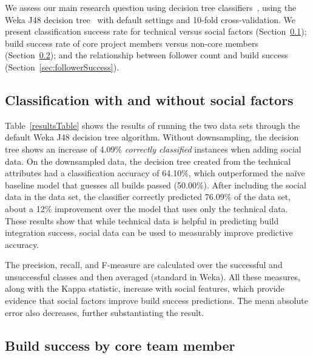 \documentclass[10pt, conference]{IEEEtran}
\begin{document}
We assess our main research question using decision tree
classifiers~\cite{Quinlan86}, using
%
the Weka J48 decision tree~\cite{Weka,Quinlan1993}
with default settings and 10-fold 
cross-validation.
We present classification
success rate for technical versus social factors
(Section~\ref{sec:successClassification}); 
build success rate of core project members versus non-core 
members (Section~\ref{sec:core}); and the relationship 
between follower count and build success (Section~\ref{sec:followerSuccess}).

\subsection{Classification with and without social factors}
\label{sec:successClassification}

Table~\ref{resultsTable} shows the results of running the two data sets through the
default Weka J48 decision tree algorithm.  Without downsampling, the 
decision tree shows an increase of 4.09\% \textit{correctly classified} instances when adding social data. On the downsampled data, the decision tree created from the technical attributes
had a classification accuracy of 64.10\%, which outperformed the na\"ive
baseline model that 
guesses all builds passed (50.00\%).
After including the social data
in the data set, the classifier correctly predicted 76.09\% of the data set,
about a 12\% improvement over the model that uses only the technical data.  These results show that
while technical data is helpful in predicting build integration success, social
data can be used to measurably improve predictive accuracy. 

The precision, recall, and
F-measure are calculated over the successful and unsuccessful classes and then
averaged (standard in Weka).  All these measures, along with the Kappa
statistic, increase with social features, which provide evidence that social 
factors improve build success predictions. The mean 
absolute error also decreases, further substantiating the result. 

\subsection{Build success by core team member}
\label{sec:core}
\end{document}
